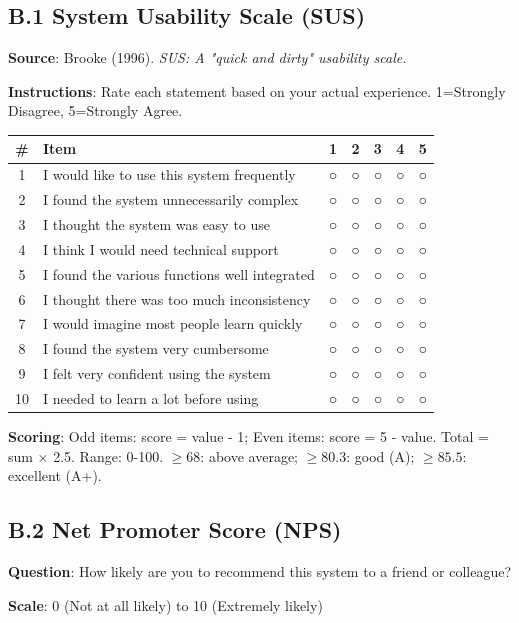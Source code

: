 \documentclass[11pt]{article}
\begin{document}
\subsection*{B.1 System Usability Scale (SUS)}

\textbf{Source}: Brooke (1996). \textit{SUS: A "quick and dirty" usability scale.}

\textbf{Instructions}: Rate each statement based on your actual experience. 1=Strongly Disagree, 5=Strongly Agree.

\begin{center}
\begin{tabular}{clccccc}
\hline
\# & Item & 1 & 2 & 3 & 4 & 5 \\
\hline
1 & I would like to use this system frequently & ○ & ○ & ○ & ○ & ○ \\
2 & I found the system unnecessarily complex & ○ & ○ & ○ & ○ & ○ \\
3 & I thought the system was easy to use & ○ & ○ & ○ & ○ & ○ \\
4 & I think I would need technical support & ○ & ○ & ○ & ○ & ○ \\
5 & I found the various functions well integrated & ○ & ○ & ○ & ○ & ○ \\
6 & I thought there was too much inconsistency & ○ & ○ & ○ & ○ & ○ \\
7 & I would imagine most people learn quickly & ○ & ○ & ○ & ○ & ○ \\
8 & I found the system very cumbersome & ○ & ○ & ○ & ○ & ○ \\
9 & I felt very confident using the system & ○ & ○ & ○ & ○ & ○ \\
10 & I needed to learn a lot before using & ○ & ○ & ○ & ○ & ○ \\
\hline
\end{tabular}
\end{center}

\textbf{Scoring}: 
Odd items: score = value - 1; Even items: score = 5 - value. 
Total = sum × 2.5. Range: 0-100. 
$\geq 68$: above average; $\geq 80.3$: good (A); $\geq 85.5$: excellent (A+).

\subsection*{B.2 Net Promoter Score (NPS)}

\textbf{Question}: How likely are you to recommend this system to a friend or colleague?

\textbf{Scale}: 0 (Not at all likely) to 10 (Extremely likely)
\end{document}
